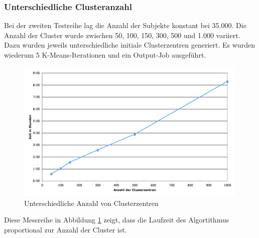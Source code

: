 \documentclass[a4paper]{llncs}
\begin{document}
\subsubsection{Unterschiedliche Clusteranzahl}
Bei der zweiten Testreihe lag die Anzahl der Subjekte konstant bei 35.000. Die Anzahl der Cluster wurde zwischen 50, 100, 150, 300, 500 und 1.000 variiert. %
Dazu wurden jeweils unterschiedliche initiale Clusterzentren generiert.
Es wurden wiederum 5 K-Means-Iterationen und ein Output-Job ausgeführt.
\begin{figure}[!ht]
\centering
\includegraphics[width=0.99\textwidth]{charts/clustercenters.png}
\caption{Unterschiedliche Anzahl von Clusterzentren}
\label{fig:centers}
\end{figure}
Diese Messreihe in Abbildung \ref{fig:centers} zeigt, dass die Laufzeit des Algortithmus proportional zur Anzahl der Cluster ist.
\end{document}
